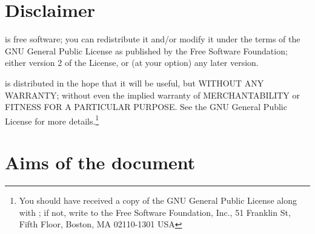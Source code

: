 
%
%
%
%


\section*{Disclaimer}
\CS is free software; you can redistribute it
and/or modify it under the terms of the GNU General Public License
as published by the Free Software Foundation; either version 2 of
the License, or (at your option) any later version.

\CS is distributed in the hope that it will be
useful, but WITHOUT ANY WARRANTY; without even the implied warranty
of MERCHANTABILITY or FITNESS FOR A PARTICULAR PURPOSE.  See the
GNU General Public License for more details.\footnote{You should have
received a copy of the GNU General Public License
along with \CS; if not, write to the
Free Software Foundation, Inc.,
51 Franklin St, Fifth Floor,
Boston, MA  02110-1301  USA}

\section{Aims of the document}


